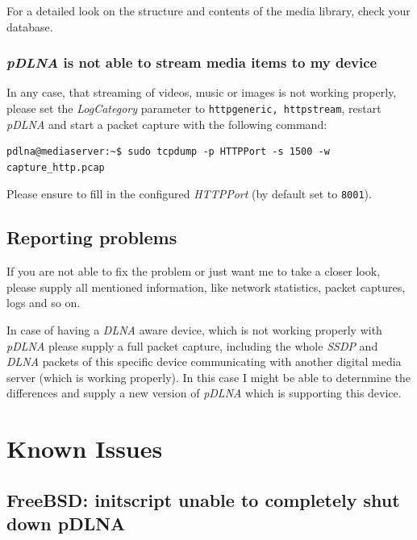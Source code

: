 \documentclass[a4paper,oneside,10pt]{report}
\begin{document}
For a detailed look on the structure and contents of the media library, check your database.

\subsection{{\em pDLNA} is not able to stream media items to my device}

In any case, that streaming of videos, music or images is not working properly, please set the {\em LogCategory} parameter to \verb|httpgeneric, httpstream|, restart {\em pDLNA} and start a packet capture with the following command:
\begin{lstlisting}
pdlna@mediaserver:~$ sudo tcpdump -p HTTPPort -s 1500 -w capture_http.pcap
\end{lstlisting}
Please ensure to fill in the configured {\em HTTPPort} (by default set to \verb|8001|).

\section{Reporting problems}

If you are not able to fix the problem or just want me to take a closer look, please supply all mentioned information, like network statistics, packet captures, logs and so on.

In case of having a {\em DLNA} aware device, which is not working properly with {\em pDLNA} please supply a full packet capture, including the whole {\em SSDP} and {\em DLNA} packets of this specific device communicating with another digital media server (which is working properly). In this case I might be able to deternmine the differences and supply a new version of {\em pDLNA} which is supporting this device.

%
%

\chapter{Known Issues}
\label{knownissues}


\section{FreeBSD: initscript unable to completely shut down pDLNA}
\end{document}
